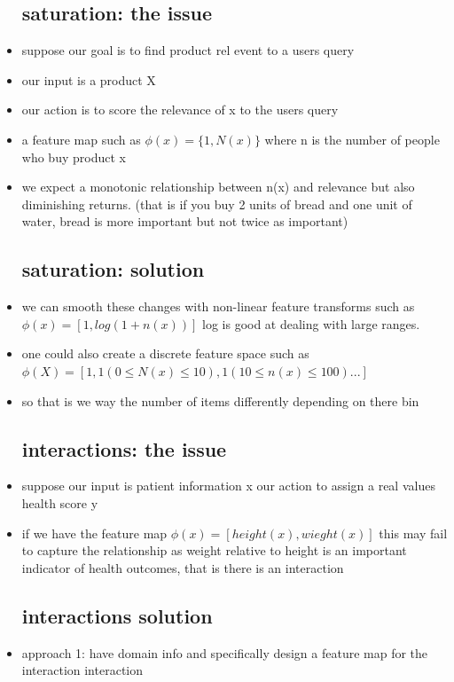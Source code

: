 \documentclass{article}
\begin{document}
\begin{itemize}
\subsection{saturation: the issue}
\item suppose our goal is to find product rel event to a users query 
\item our input is a product X
\item our action is to score the relevance of x to the users query 
\item a feature map such as $\phi(x)=\{1,N(x)\}$ where n is the number of people who buy product x 
\item we expect a monotonic relationship between n(x) and relevance but also diminishing returns. (that is if you buy 2 units of bread and one unit of water, bread is more important but not twice as important)
\subsection{saturation: solution}
\item we can smooth these changes with non-linear feature transforms such as $\phi(x)=[1,log(1+n(x))]$ log is good at dealing with large ranges. 
\item one could also create a discrete feature space such as $\phi(X)=[1, 1(0\leq N(x)\leq 10), 1(10\leq n(x)\leq 100)...]$
\item so that is we way the number of items differently depending on there bin 
\subsection{interactions: the issue}
\item suppose our input is patient information x
\itme our action to assign a real values health score y
\item if we have the feature map $\phi(x)=[height(x),wieght(x)]$ this may fail to capture the relationship as weight relative to height is an important indicator of health outcomes, that is there is an interaction 
\subsection{interactions solution}
\item approach 1: have domain info and specifically design a feature map for the interaction interaction 


\end{itemize}
\end{document}
